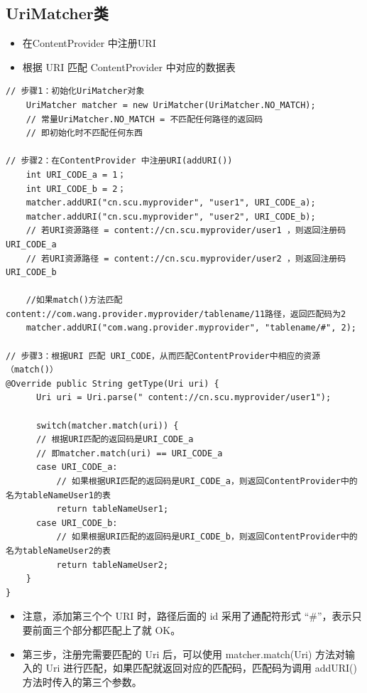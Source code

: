 \documentclass[9pt, b5paper]{article}
\begin{document}
\subsection{UriMatcher类}
\label{sec-1-6}
\begin{itemize}
\item 在ContentProvider 中注册URI
\item 根据 URI 匹配 ContentProvider 中对应的数据表
\end{itemize}
\begin{verbatim}
// 步骤1：初始化UriMatcher对象
    UriMatcher matcher = new UriMatcher(UriMatcher.NO_MATCH); 
    // 常量UriMatcher.NO_MATCH = 不匹配任何路径的返回码
    // 即初始化时不匹配任何东西

// 步骤2：在ContentProvider 中注册URI(addURI())
    int URI_CODE_a = 1；
    int URI_CODE_b = 2；
    matcher.addURI("cn.scu.myprovider", "user1", URI_CODE_a); 
    matcher.addURI("cn.scu.myprovider", "user2", URI_CODE_b); 
    // 若URI资源路径 = content://cn.scu.myprovider/user1 ，则返回注册码URI_CODE_a
    // 若URI资源路径 = content://cn.scu.myprovider/user2 ，则返回注册码URI_CODE_b

    //如果match()方法匹配content://com.wang.provider.myprovider/tablename/11路径，返回匹配码为2
    matcher.addURI("com.wang.provider.myprovider", "tablename/#", 2);

// 步骤3：根据URI 匹配 URI_CODE，从而匹配ContentProvider中相应的资源（match()）
@Override public String getType(Uri uri) {   
      Uri uri = Uri.parse(" content://cn.scu.myprovider/user1");   

      switch(matcher.match(uri)) {   
      // 根据URI匹配的返回码是URI_CODE_a
      // 即matcher.match(uri) == URI_CODE_a
      case URI_CODE_a:   
          // 如果根据URI匹配的返回码是URI_CODE_a，则返回ContentProvider中的名为tableNameUser1的表
          return tableNameUser1;   
      case URI_CODE_b:   
          // 如果根据URI匹配的返回码是URI_CODE_b，则返回ContentProvider中的名为tableNameUser2的表
          return tableNameUser2;
    }   
}
\end{verbatim}
\begin{itemize}
\item 注意，添加第三个个 URI 时，路径后面的 id 采用了通配符形式 “\#”，表示只要前面三个部分都匹配上了就 OK。
\item 第三步，注册完需要匹配的 Uri 后，可以使用 matcher.match(Uri) 方法对输入的 Uri 进行匹配，如果匹配就返回对应的匹配码，匹配码为调用 addURI() 方法时传入的第三个参数。
\end{itemize}
\end{document}
